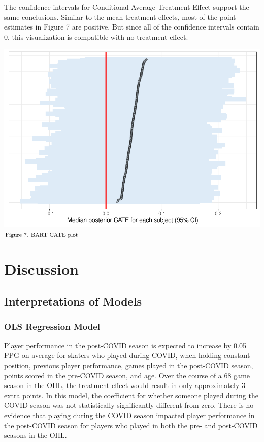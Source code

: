 \documentclass[12pt]{article}
\begin{document}
The confidence intervals for Conditional Average Treatment Effect
support the same conclusions. Similar to the mean treatment effects,
most of the point estimates in Figure 7 are positive. But since all of
the confidence intervals contain 0, this visualization is compatible
with no treatment effect.

\includegraphics{journal-article-nb_files/figure-latex/bart-cates-1.pdf}
\(\hspace*{\fill} \footnotesize \text{Figure 7. BART CATE plot}\)

\hypertarget{discussion}{%
\section{Discussion}\label{discussion}}

\hypertarget{interpretations-of-models}{%
\subsection{Interpretations of Models}\label{interpretations-of-models}}

\hypertarget{ols-regression-model}{%
\subsubsection{OLS Regression Model}\label{ols-regression-model}}

Player performance in the post-COVID season is expected to increase by
0.05 PPG on average for skaters who played during COVID, when holding
constant position, previous player performance, games played in the
post-COVID season, points scored in the pre-COVID season, and age. Over
the course of a 68 game season in the OHL, the treatment effect would
result in only approximately 3 extra points. In this model, the
coefficient for whether someone played during the COVID-season was not
statistically significantly different from zero. There is no evidence
that playing during the COVID season impacted player performance in the
post-COVID season for players who played in both the pre- and post-COVID
seasons in the OHL.
\end{document}
